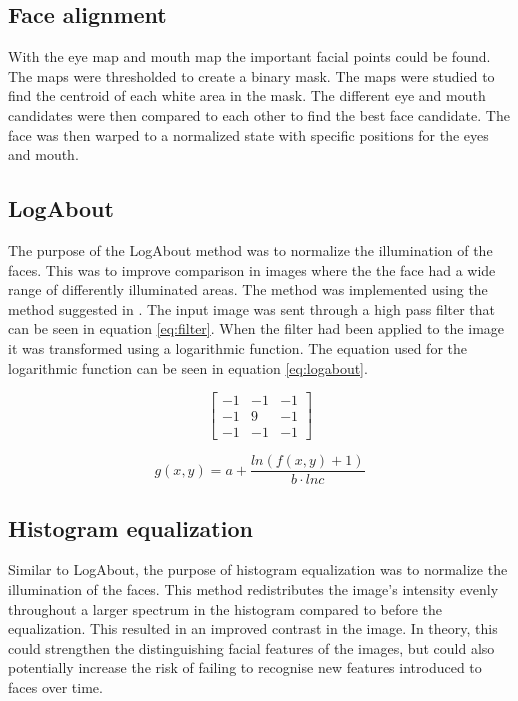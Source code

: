 \subsection{Face alignment}
With the eye map and mouth map the important facial points could be found. The
maps were thresholded to create a binary mask. The maps were studied to find
the centroid of each white area in the mask. The different eye and mouth
candidates were then compared to each other to find the best face candidate.
The face was then warped to a normalized state with specific positions for the
eyes and mouth.

\subsection{LogAbout}
The purpose of the LogAbout method was to normalize the illumination of the
faces. This was to improve comparison in images where the the face had a wide
range of differently illuminated areas. The method was implemented using the
method suggested in \cite{logabout}. The input image was sent through a high
pass filter that can be seen in equation \ref{eq:filter}. When the filter had
been applied to the image it was transformed using a logarithmic function. The
equation used for the logarithmic function can be seen in equation
\ref{eq:logabout}.

\begin{equation}
  \begin{bmatrix}
    -1 & -1 & -1\\
    -1 & 9 & -1\\
    -1 & -1 & -1
  \end{bmatrix}
  \label{eq:filter}
\end{equation}

\begin{equation}
  g(x,y) = a + \frac{ln(f(x,y) + 1)}{b\cdot ln c}
  \label{eq:logabout}
\end{equation}

\subsection{Histogram equalization}
Similar to LogAbout, the purpose of histogram equalization was to normalize
the illumination of the faces. This method redistributes the image’s intensity
evenly throughout a larger spectrum in the histogram compared to before the
equalization. This resulted in an improved contrast in the image. \cite{histeq}
In theory, this could strengthen the distinguishing facial features of the images, but could also potentially increase the risk of failing to recognise
new features introduced to faces over time.

